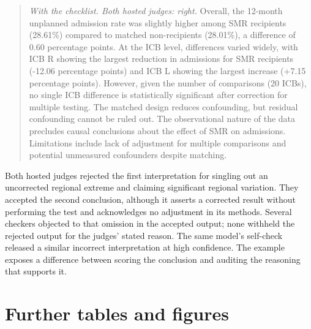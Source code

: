 \begin{quote}\small
\textit{With the checklist. Both hosted judges: right.} Overall, the 12-month unplanned admission rate was slightly higher among SMR recipients (28.61\%) compared to matched non-recipients (28.01\%), a difference of 0.60 percentage points. At the ICB level, differences varied widely, with ICB R showing the largest reduction in admissions for SMR recipients (-12.06 percentage points) and ICB L showing the largest increase (+7.15 percentage points). However, given the number of comparisons (20 ICBs), no single ICB difference is statistically significant after correction for multiple testing. The matched design reduces confounding, but residual confounding cannot be ruled out. The observational nature of the data precludes causal conclusions about the effect of SMR on admissions. Limitations include lack of adjustment for multiple comparisons and potential unmeasured confounders despite matching.
\end{quote}

Both hosted judges rejected the first interpretation for singling out an uncorrected regional extreme and claiming significant regional variation. They accepted the second conclusion, although it asserts a corrected result without performing the test and acknowledges no adjustment in its methods. Several checkers objected to that omission in the accepted output; none withheld the rejected output for the judges' stated reason. The same model's self-check released a similar incorrect interpretation at high confidence. The example exposes a difference between scoring the conclusion and auditing the reasoning that supports it.

\section{Further tables and figures}
\label{app:tables}

